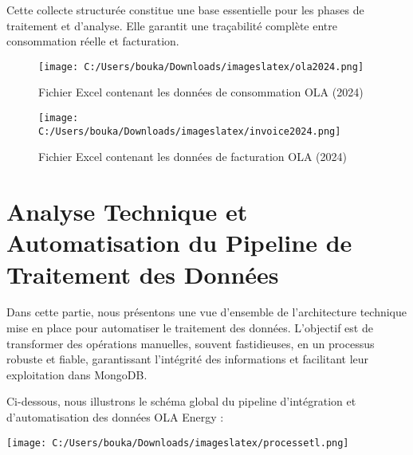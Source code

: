 \documentclass[a4paper,11pt]{report}
\begin{document}
Cette collecte structurée constitue une base essentielle pour les phases de traitement et d’analyse. Elle garantit une traçabilité complète entre consommation réelle et facturation.

\begin{figure}[htbp]
  \centering
  \texttt{[image: C:/Users/bouka/Downloads/imageslatex/ola2024.png]}
  \caption{Fichier Excel contenant les données de consommation OLA (2024)}
  \label{fig:consomm-ola-2024}
\end{figure}

\vspace{-1em} %

\begin{figure}[htbp]
  \centering
  \texttt{[image: C:/Users/bouka/Downloads/imageslatex/invoice2024.png]}
  \caption{Fichier Excel contenant les données de facturation OLA (2024)}
  \label{fig:facturation-ola-2024}
\end{figure}

\newpage

\section{Analyse Technique et Automatisation du Pipeline de Traitement des Données}

Dans cette partie, nous présentons une vue d’ensemble de l’architecture technique mise en place pour automatiser le traitement des données. L’objectif est de transformer des opérations manuelles, souvent fastidieuses, en un processus robuste et fiable, garantissant l’intégrité des informations et facilitant leur exploitation dans MongoDB.

\vspace{1em}

\noindent Ci-dessous, nous illustrons le schéma global du pipeline d’intégration et d’automatisation des données OLA Energy :

\vspace{0.5em}



\begin{tcolorbox}[%
  colback=gray!5,
  colframe=blue!50!black,
  title=\textbf{Schéma global du pipeline de traitement OLA Energy},
  fonttitle=\bfseries\large,
  boxrule=0.8pt,
  arc=4pt,
  enhanced,
  sharp corners=south,
  breakable,
  center title
]
  \vspace{0.5em}
  \centering
  \texttt{[image: C:/Users/bouka/Downloads/imageslatex/processetl.png]}
  \vspace{0.5em}
  \label{fig:processus-automation}
\end{tcolorbox}
\end{document}
